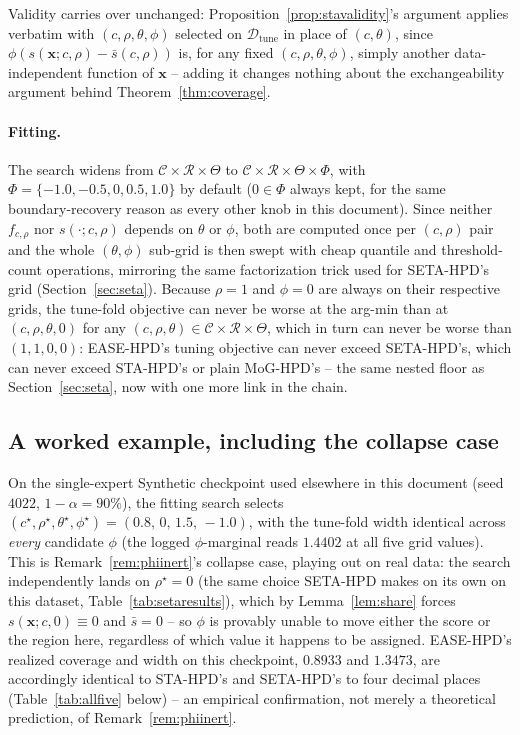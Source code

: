 \documentclass[11pt]{article}
\begin{document}
Validity carries over unchanged: Proposition~\ref{prop:stavalidity}'s argument applies verbatim
with $(c,\rho,\theta,\phi)$ selected on $\mathcal D_{\mathrm{tune}}$ in place of $(c,\theta)$, since
$\phi(s(\bm x;c,\rho)-\bar s(c,\rho))$ is, for any fixed $(c,\rho,\theta,\phi)$, simply another
data-independent function of $\bm x$ -- adding it changes nothing about the exchangeability
argument behind Theorem~\ref{thm:coverage}.

\paragraph{Fitting.} The search widens from $\mathcal C\times\mathcal R\times\Theta$ to $\mathcal
C\times\mathcal R\times\Theta\times\Phi$, with $\Phi=\{-1.0,-0.5,0,0.5,1.0\}$ by default ($0\in\Phi$
always kept, for the same boundary-recovery reason as every other knob in this document). Since
neither $f_{c,\rho}$ nor $s(\cdot;c,\rho)$ depends on $\theta$ or $\phi$, both are computed once per
$(c,\rho)$ pair and the whole $(\theta,\phi)$ sub-grid is then swept with cheap quantile and
threshold-count operations, mirroring the same factorization trick used for SETA-HPD's grid
(Section~\ref{sec:seta}). Because $\rho=1$ and $\phi=0$ are always on their respective grids, the
tune-fold objective can never be worse at the arg-min than at $(c,\rho,\theta,0)$ for any
$(c,\rho,\theta)\in\mathcal C\times\mathcal R\times\Theta$, which in turn can never be worse than
$(1,1,0,0)$: EASE-HPD's tuning objective can never exceed SETA-HPD's, which can never exceed
STA-HPD's or plain MoG-HPD's -- the same nested floor as Section~\ref{sec:seta}, now with one more
link in the chain.

\subsection{A worked example, including the collapse case}
\label{sec:easeexample}

On the single-expert Synthetic checkpoint used elsewhere in this document (seed $4022$,
$1-\alpha=90\%$), the fitting search selects $(c^\star,\rho^\star,\theta^\star,\phi^\star) =
(0.8,\,0,\,1.5,\,-1.0)$, with the tune-fold width identical across \emph{every} candidate $\phi$
(the logged $\phi$-marginal reads $1.4402$ at all five grid values). This is
Remark~\ref{rem:phiinert}'s collapse case, playing out on real data: the search independently lands
on $\rho^\star=0$ (the same choice SETA-HPD makes on its own on this dataset,
Table~\ref{tab:setaresults}), which by Lemma~\ref{lem:share} forces $s(\bm x;c,0)\equiv0$ and $\bar
s=0$ -- so $\phi$ is provably unable to move either the score or the region here, regardless of
which value it happens to be assigned. EASE-HPD's realized coverage and width on this checkpoint,
$0.8933$ and $1.3473$, are accordingly identical to STA-HPD's and SETA-HPD's to four decimal
places (Table~\ref{tab:allfive} below) -- an empirical confirmation, not merely a theoretical
prediction, of Remark~\ref{rem:phiinert}.
\end{document}
